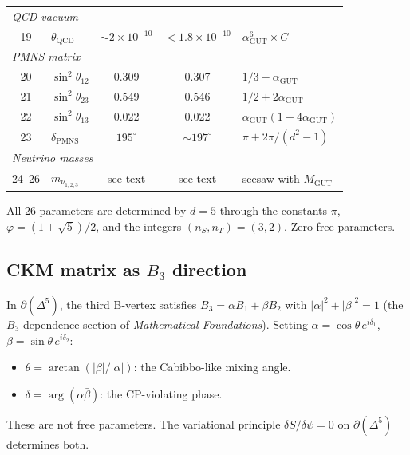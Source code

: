 \documentclass[12pt]{article}
\theoremstyle{remark}
\theoremstyle{definition}
\newcommand{\agut}{\alpha_{\mathrm{GUT}}}
\begin{document}
\begin{center}
\begin{tabular}{clccl}
\hline
\multicolumn{5}{l}{\emph{QCD vacuum}} \\
19 & $\theta_\text{QCD}$ & $\sim 2\!\times\! 10^{-10}$ & $< 1.8\!\times\! 10^{-10}$ & $\alpha_\text{GUT}^6 \times C$ \\
\hline
\multicolumn{5}{l}{\emph{PMNS matrix}} \\
20 & $\sin^2\theta_{12}$ & 0.309 & 0.307 & $1/3 - \alpha_\text{GUT}$ \\
21 & $\sin^2\theta_{23}$ & 0.549 & 0.546 & $1/2 + 2\alpha_\text{GUT}$ \\
22 & $\sin^2\theta_{13}$ & 0.022 & 0.022 & $\agut(1-4\agut)$ \\
23 & $\delta_\text{PMNS}$ & $195^\circ$ & $\sim 197^\circ$ & $\pi + 2\pi/(d^2\!-\!1)$ \\
\hline
\multicolumn{5}{l}{\emph{Neutrino masses}} \\
24--26 & $m_{\nu_{1,2,3}}$ & see text & see text & seesaw with $M_\text{GUT}$ \\
\hline
\end{tabular}
\end{center}

\medskip
\noindent All 26 parameters are determined by $d = 5$ through the constants $\pi$, $\varphi = (1+\sqrt{5})/2$, and the integers $(n_S, n_T) = (3, 2)$. Zero free parameters.

\subsection{CKM matrix as $B_3$ direction}
\label{sec:ckm_geometry}

In $\partial(\Delta^5)$, the third B-vertex satisfies $B_3 = \alpha B_1 + \beta B_2$ with $|\alpha|^2 + |\beta|^2 = 1$ (the $B_3$ dependence section of \textit{Mathematical Foundations}).  Setting $\alpha = \cos\theta\,e^{i\delta_1}$, $\beta = \sin\theta\,e^{i\delta_2}$:

\begin{itemize}
\item $\theta = \arctan(|\beta|/|\alpha|)$: the Cabibbo-like mixing angle.
\item $\delta = \arg(\alpha\bar\beta)$: the CP-violating phase.
\end{itemize}

These are not free parameters.  The variational principle $\delta S/\delta\psi = 0$ on $\partial(\Delta^5)$ determines both.
\end{document}
